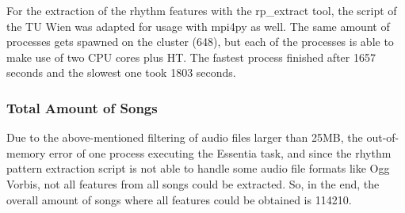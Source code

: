 \noindent For the extraction of the rhythm features with the rp\_extract tool, the script of the TU Wien was adapted for usage with mpi4py as well. The same amount of processes gets spawned on the cluster (648), but each of the processes is able to make use of two CPU cores plus HT. The fastest process finished after 1657 seconds and the slowest one took 1803 seconds.

\subsubsection{Total Amount of Songs}\label{totamsong}

Due to the above-mentioned filtering of audio files larger than 25MB, the out-of-memory error of one process executing the Essentia task, and since the rhythm pattern extraction script is not able to handle some audio file formats like Ogg Vorbis, not all features from all songs could be extracted. So, in the end, the overall amount of songs where all features could be obtained is 114210.\\



